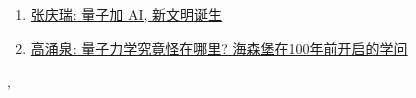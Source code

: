 \documentclass[11pt]{article}
\renewcommand{\today}{\shortmonthname[\the\month] \the \day,  \the\year}
\begin{document}
\begin{enumerate}
	\item \href{https://mp.weixin.qq.com/s/RGlpCiKHJDw_mLl1JJ0ZgA}{张庆瑞: 量子加 AI, 新文明诞生}	%
	\item \href{https://mp.weixin.qq.com/s/vYmzBTTf125aUoO8d4zGKA}{高涌泉: 量子力学究竟怪在哪里? 海森堡在100年前开启的学问}	%
\end{enumerate}




%
\begin{flushright}
	\tiny \today 
\end{flushright}
\end{document}
